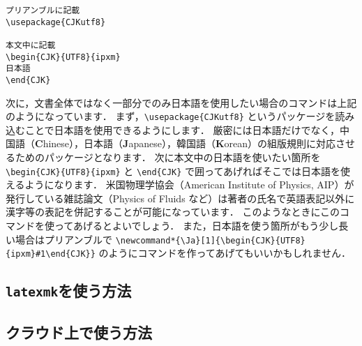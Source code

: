 \begin{tcolorbox}[enhanced, title=文書の一部分で日本語を使用, drop fuzzy shadow]
\begin{verbatim}
プリアンブルに記載
\usepackage{CJKutf8}

本文中に記載
\begin{CJK}{UTF8}{ipxm}
日本語
\end{CJK}
\end{verbatim}
\end{tcolorbox}

次に，文書全体ではなく一部分でのみ日本語を使用したい場合のコマンドは上記のようになっています．
まず，\verb|\usepackage{CJKutf8}| というパッケージを読み込むことで日本語を使用できるようにします．
厳密には日本語だけでなく，中国語（\textbf{C}hinese），日本語（\textbf{J}apanese），韓国語（\textbf{K}orean）の組版規則に対応させるためのパッケージとなります．
次に本文中の日本語を使いたい箇所を \verb|\begin{CJK}{UTF8}{ipxm}| と \verb|\end{CJK}| で囲ってあげればそこでは日本語を使えるようになります．
米国物理学協会（American Institute of Physics, AIP）が発行している雑誌論文（Physics of Fluids など）は著者の氏名で英語表記以外に漢字等の表記を併記することが可能になっています．
このようなときにこのコマンドを使ってあげるとよいでしょう．
また，日本語を使う箇所がもう少し長い場合はプリアンブルで \verb|\newcommand*{\Ja}[1]{\begin{CJK}{UTF8}{ipxm}#1\end{CJK}}| のようにコマンドを作ってあげてもいいかもしれません．

\subsection{\texttt{latexmk}を使う方法}
\label{ssec:latexmk}

\lipsum[1-8]

\subsection{クラウド上で使う方法}
\label{ssec:cloud}


\lipsum[1-4]
